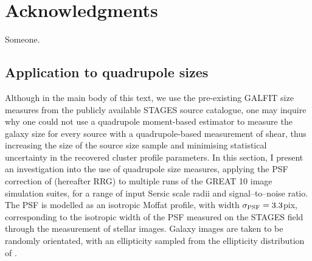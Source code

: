 \documentclass[useAMS,usenatbib,times,letter,amssymb]{mn2e}
\begin{document}
\section*{Acknowledgments}

Someone.


\setlength{\bibhang}{2.0em}
\setlength{}


\appendix

\subsection{Application to quadrupole sizes}\label{sec:STAGES_RRG_Measurement}

Although in the main body of this text, we use the pre-existing GALFIT size measures from the publicly available STAGES source catalogue, one may inquire why one could not use a quadrupole moment-based estimator to measure the galaxy size for every source with a quadrupole-based measurement of shear, thus increasing the size of the source size sample and minimising statistical uncertainty in the recovered cluster profile parameters. In this section, I present an investigation into the use of quadrupole size measures, applying the PSF correction of \cite{Rhodes:2000p2068} (hereafter RRG) to multiple runs of the GREAT 10 image simulation suites, for a range of input Sersic scale radii and signal--to--noise ratio. The PSF is modelled as an isotropic Moffat profile, with width $\sigma_{\rm PSF} = 3.3$pix, corresponding to the isotropic width of the PSF measured on the STAGES field through the measurement of stellar images. Galaxy images are taken to be randomly orientated, with an ellipticity sampled from the ellipticity distribution of \cite{Miller:2013p2259}. 
\end{document}
